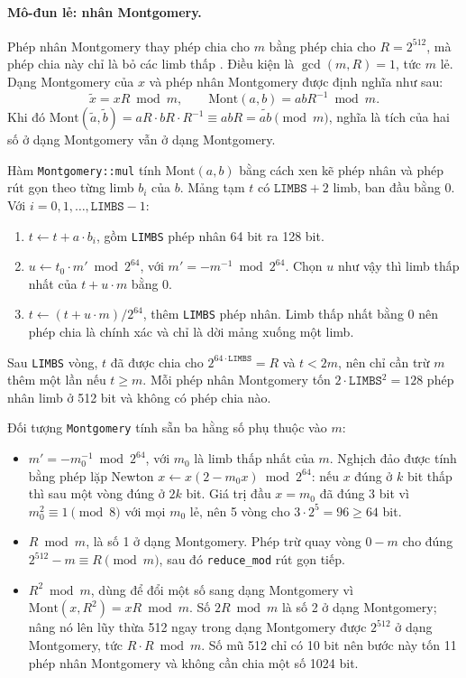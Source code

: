 \paragraph{Mô-đun lẻ: nhân Montgomery.} Phép nhân Montgomery thay phép chia cho $m$ bằng phép chia cho $R = 2^{512}$, mà phép chia này chỉ là bỏ các limb thấp \cite{menezes1996handbook}. Điều kiện là $\gcd(m, R) = 1$, tức $m$ lẻ. Dạng Montgomery của $x$ và phép nhân Montgomery được định nghĩa như sau:
\begin{equation}
\tilde{x} = xR \bmod m, \qquad \mathrm{Mont}(a, b) = a b R^{-1} \bmod m .
\end{equation}
Khi đó $\mathrm{Mont}(\tilde{a}, \tilde{b}) = aR \cdot bR \cdot R^{-1} \equiv abR = \widetilde{ab} \pmod m$, nghĩa là tích của hai số ở dạng Montgomery vẫn ở dạng Montgomery.

Hàm \texttt{Montgomery::mul} tính $\mathrm{Mont}(a, b)$ bằng cách xen kẽ phép nhân và phép rút gọn theo từng limb $b_i$ của $b$. Mảng tạm $t$ có $\texttt{LIMBS} + 2$ limb, ban đầu bằng 0. Với $i = 0, 1, \dots, \texttt{LIMBS} - 1$:
\begin{enumerate}
    \item $t \leftarrow t + a \cdot b_i$, gồm \texttt{LIMBS} phép nhân 64 bit ra 128 bit.
    \item $u \leftarrow t_0 \cdot m' \bmod 2^{64}$, với $m' = -m^{-1} \bmod 2^{64}$. Chọn $u$ như vậy thì limb thấp nhất của $t + u \cdot m$ bằng 0.
    \item $t \leftarrow (t + u \cdot m) / 2^{64}$, thêm \texttt{LIMBS} phép nhân. Limb thấp nhất bằng 0 nên phép chia là chính xác và chỉ là dời mảng xuống một limb.
\end{enumerate}
Sau \texttt{LIMBS} vòng, $t$ đã được chia cho $2^{64 \cdot \texttt{LIMBS}} = R$ và $t < 2m$, nên chỉ cần trừ $m$ thêm một lần nếu $t \ge m$. Mỗi phép nhân Montgomery tốn $2 \cdot \texttt{LIMBS}^2 = 128$ phép nhân limb ở 512 bit và không có phép chia nào.

Đối tượng \texttt{Montgomery} tính sẵn ba hằng số phụ thuộc vào $m$:
\begin{itemize}
    \item $m' = -m_0^{-1} \bmod 2^{64}$, với $m_0$ là limb thấp nhất của $m$. Nghịch đảo được tính bằng phép lặp Newton $x \leftarrow x (2 - m_0 x) \bmod 2^{64}$: nếu $x$ đúng ở $k$ bit thấp thì sau một vòng đúng ở $2k$ bit. Giá trị đầu $x = m_0$ đã đúng 3 bit vì $m_0^2 \equiv 1 \pmod 8$ với mọi $m_0$ lẻ, nên 5 vòng cho $3 \cdot 2^5 = 96 \ge 64$ bit.
    \item $R \bmod m$, là số 1 ở dạng Montgomery. Phép trừ quay vòng $0 - m$ cho đúng $2^{512} - m \equiv R \pmod m$, sau đó \texttt{reduce\_mod} rút gọn tiếp.
    \item $R^2 \bmod m$, dùng để đổi một số sang dạng Montgomery vì $\mathrm{Mont}(x, R^2) = xR \bmod m$. Số $2R \bmod m$ là số 2 ở dạng Montgomery; nâng nó lên lũy thừa 512 ngay trong dạng Montgomery được $2^{512}$ ở dạng Montgomery, tức $R \cdot R \bmod m$. Số mũ 512 chỉ có 10 bit nên bước này tốn 11 phép nhân Montgomery và không cần chia một số 1024 bit.
\end{itemize}

